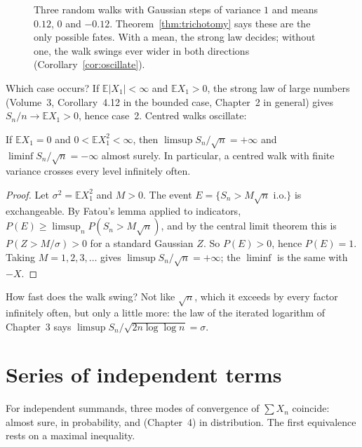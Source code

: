 \begin{figure}[ht]
\centering{}
\caption{Three random walks with Gaussian steps of variance $1$ and means $0.12$, $0$ and $-0.12$. Theorem~\ref{thm:trichotomy} says
these are the only possible fates. With a mean, the strong law decides; without one, the walk swings ever wider in both
directions (Corollary~\ref{cor:oscillate}).}
\label{fig:trichotomy}
\end{figure}

Which case occurs? If $\mathbb E|X_1|<\infty$ and $\mathbb E X_1>0$, the strong law of large numbers (Volume~3, Corollary~4.12 in
the bounded case, Chapter~2 in general) gives $S_n/n\to\mathbb E X_1>0$, hence case~2. Centred walks oscillate:

\begin{corollary}\label{cor:oscillate}
If $\mathbb E X_1=0$ and $0<\mathbb E X_1^2<\infty$, then $\limsup S_n/\sqrt n=+\infty$ and $\liminf S_n/\sqrt n=-\infty$
almost surely. In particular, a centred walk with finite variance crosses every level infinitely often.
\end{corollary}
\begin{proof}
Let $\sigma^2=\mathbb E X_1^2$ and $M>0$. The event $E=\{S_n>M\sqrt n\text{ i.o.}\}$ is exchangeable. By Fatou's lemma applied to
indicators, $P(E)\ge\limsup_nP(S_n>M\sqrt n)$, and by the central limit theorem this is $P(Z>M/\sigma)>0$ for a standard
Gaussian $Z$. So $P(E)>0$, hence $P(E)=1$. Taking $M=1,2,3,\dots$ gives $\limsup S_n/\sqrt n=+\infty$; the $\liminf$ is the
same with $-X$.
\end{proof}

How fast does the walk swing? Not like $\sqrt n$, which it exceeds by every factor infinitely often, but only a little more:
the law of the iterated logarithm of Chapter~3 says $\limsup S_n/\sqrt{2n\log\log n}=\sigma$.

\section{Series of independent terms}

For independent summands, three modes of convergence of $\sum X_n$ coincide: almost sure, in probability, and (Chapter~4)
in distribution. The first equivalence rests on a maximal inequality.

